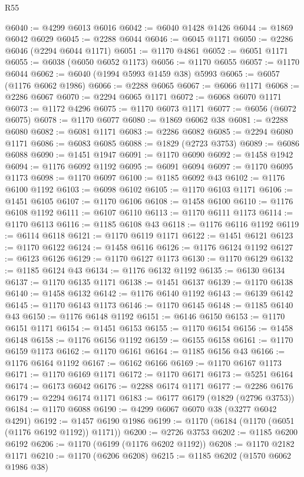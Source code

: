 \begin{lexlean}{R55}
\begin{coremodule}
@6040 := @4299 @6013 @6016
@6042 := @6040 @1428 @1426
@6044 := @1869 @6042 @6029
@6045 := @2288 @6044
@6046 := @6045 @1171
@6050 := @2286 @6046 (@2294 @6044 @1171)
@6051 := @1170 @4861
@6052 := @6051 @1171
@6055 := @6038 (@6050 @6052 @1173)
@6056 := @1170 @6055
@6057 := @1170 @6044
@6062 := @6040 (@1994 @5993 @1459 @38) @5993
@6065 := @6057 (@1176 @6062 @1986)
@6066 := @2288 @6065
@6067 := @6066 @1171
@6068 := @2286 @6067
@6070 := @2294 @6065 @1171
@6072 := @6068 @6070 @1171
@6073 := @1172 @4296
@6075 := @1170 @6073 @1171
@6077 := @6056 (@6072 @6075)
@6078 := @1170 @6077
@6080 := @1869 @6062 @38
@6081 := @2288 @6080
@6082 := @6081 @1171
@6083 := @2286 @6082
@6085 := @2294 @6080 @1171
@6086 := @6083 @6085
@6088 := @1829 (@2723 @3753)
@6089 := @6086 @6088
@6090 := @1451 @1947
@6091 := @1170 @6090
@6092 := @1458 @1942
@6094 := @1176 @6092 @1192
@6095 := @6091 @6094
@6097 := @1170 @6095 @1173
@6098 := @1170 @6097
@6100 := @1185 @6092 @43
@6102 := @1176 @6100 @1192
@6103 := @6098 @6102
@6105 := @1170 @6103 @1171
@6106 := @1451 @6105
@6107 := @1170 @6106
@6108 := @1458 @6100
@6110 := @1176 @6108 @1192
@6111 := @6107 @6110
@6113 := @1170 @6111 @1173
@6114 := @1170 @6113
@6116 := @1185 @6108 @43
@6118 := @1176 @6116 @1192
@6119 := @6114 @6118
@6121 := @1170 @6119 @1171
@6122 := @1451 @6121
@6123 := @1170 @6122
@6124 := @1458 @6116
@6126 := @1176 @6124 @1192
@6127 := @6123 @6126
@6129 := @1170 @6127 @1173
@6130 := @1170 @6129
@6132 := @1185 @6124 @43
@6134 := @1176 @6132 @1192
@6135 := @6130 @6134
@6137 := @1170 @6135 @1171
@6138 := @1451 @6137
@6139 := @1170 @6138
@6140 := @1458 @6132
@6142 := @1176 @6140 @1192
@6143 := @6139 @6142
@6145 := @1170 @6143 @1173
@6146 := @1170 @6145
@6148 := @1185 @6140 @43
@6150 := @1176 @6148 @1192
@6151 := @6146 @6150
@6153 := @1170 @6151 @1171
@6154 := @1451 @6153
@6155 := @1170 @6154
@6156 := @1458 @6148
@6158 := @1176 @6156 @1192
@6159 := @6155 @6158
@6161 := @1170 @6159 @1173
@6162 := @1170 @6161
@6164 := @1185 @6156 @43
@6166 := @1176 @6164 @1192
@6167 := @6162 @6166
@6169 := @1170 @6167 @1173
@6171 := @1170 @6169 @1171
@6172 := @1170 @6171
@6173 := @5251 @6164
@6174 := @6173 @6042
@6176 := @2288 @6174 @1171
@6177 := @2286 @6176
@6179 := @2294 @6174 @1171
@6183 := @6177 @6179 (@1829 (@2796 @3753))
@6184 := @1170 @6088
@6190 := @4299 @6067 @6070 @38 (@3277 @6042 @4291)
@6192 := @1457 @6190 @1986
@6199 := @1170 (@6184 (@1170 (@6051 (@1176 @6192 @1192)) @1171))
@6200 := @2726 @3753
@6202 := @1185 @6200 @6192
@6206 := @1170 (@6199 (@1176 @6202 @1192))
@6208 := @1170 @2182 @1171
@6210 := @1170 (@6206 @6208)
@6215 := @1185 @6202 (@1570 @6062 @1986 @38)

\end{coremodule}
\end{lexlean}
